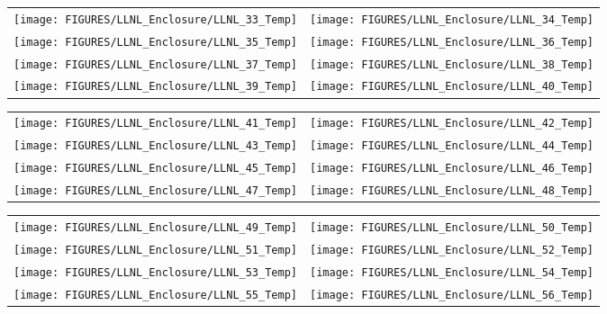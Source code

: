 \begin{figure}[p]
\begin{tabular*}{\textwidth}{l@{\extracolsep{\fill}}r}
\texttt{[image: FIGURES/LLNL\_Enclosure/LLNL\_33\_Temp]} &
\texttt{[image: FIGURES/LLNL\_Enclosure/LLNL\_34\_Temp]} \\
\texttt{[image: FIGURES/LLNL\_Enclosure/LLNL\_35\_Temp]} &
\texttt{[image: FIGURES/LLNL\_Enclosure/LLNL\_36\_Temp]} \\
\texttt{[image: FIGURES/LLNL\_Enclosure/LLNL\_37\_Temp]} &
\texttt{[image: FIGURES/LLNL\_Enclosure/LLNL\_38\_Temp]} \\
\texttt{[image: FIGURES/LLNL\_Enclosure/LLNL\_39\_Temp]} &
\texttt{[image: FIGURES/LLNL\_Enclosure/LLNL\_40\_Temp]}
\end{tabular*}
\label{LLNL_Enclosure_Temp_5}
\end{figure}

\begin{figure}[p]
\begin{tabular*}{\textwidth}{l@{\extracolsep{\fill}}r}
\texttt{[image: FIGURES/LLNL\_Enclosure/LLNL\_41\_Temp]} &
\texttt{[image: FIGURES/LLNL\_Enclosure/LLNL\_42\_Temp]} \\
\texttt{[image: FIGURES/LLNL\_Enclosure/LLNL\_43\_Temp]} &
\texttt{[image: FIGURES/LLNL\_Enclosure/LLNL\_44\_Temp]} \\
\texttt{[image: FIGURES/LLNL\_Enclosure/LLNL\_45\_Temp]} &
\texttt{[image: FIGURES/LLNL\_Enclosure/LLNL\_46\_Temp]} \\
\texttt{[image: FIGURES/LLNL\_Enclosure/LLNL\_47\_Temp]} &
\texttt{[image: FIGURES/LLNL\_Enclosure/LLNL\_48\_Temp]}
\end{tabular*}
\label{LLNL_Enclosure_Temp_6}
\end{figure}

\begin{figure}[p]
\begin{tabular*}{\textwidth}{l@{\extracolsep{\fill}}r}
\texttt{[image: FIGURES/LLNL\_Enclosure/LLNL\_49\_Temp]} &
\texttt{[image: FIGURES/LLNL\_Enclosure/LLNL\_50\_Temp]} \\
\texttt{[image: FIGURES/LLNL\_Enclosure/LLNL\_51\_Temp]} &
\texttt{[image: FIGURES/LLNL\_Enclosure/LLNL\_52\_Temp]} \\
\texttt{[image: FIGURES/LLNL\_Enclosure/LLNL\_53\_Temp]} &
\texttt{[image: FIGURES/LLNL\_Enclosure/LLNL\_54\_Temp]} \\
\texttt{[image: FIGURES/LLNL\_Enclosure/LLNL\_55\_Temp]} &
\texttt{[image: FIGURES/LLNL\_Enclosure/LLNL\_56\_Temp]}
\end{tabular*}
\label{LLNL_Enclosure_Temp_7}
\end{figure}


